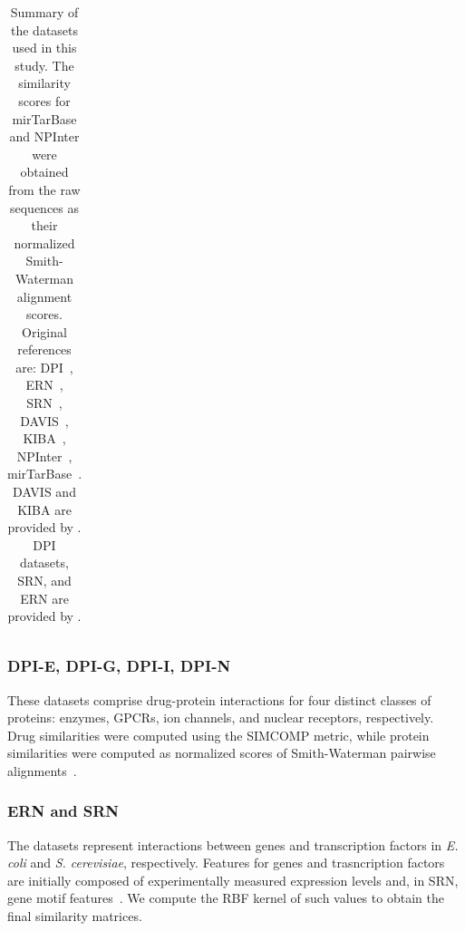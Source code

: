 \begin{table}[tb]
\begin{tabular}{lrrr}
        \bottomrule
    \end{tabular}
    \caption{Summary of the datasets used in this study. The similarity scores for mirTarBase and NPInter were obtained from the raw sequences as their normalized Smith-Waterman alignment scores. %
    Original references are:
        DPI~\cite{yamanishi2008},
        ERN~\cite{faith2007},
        SRN~\cite{macisaac2006}, %
        DAVIS~\cite{davis2011}, %
        KIBA~\cite{tang2014}, %
        NPInter~\cite{teng2020npinter}, 
        mirTarBase~\cite{huang2022mirtarbase}. 
        DAVIS and KIBA are provided by \citet{huang2020deeppurpose}. DPI datasets, SRN, and ERN are provided by \citet{schrynemackers2015}.
}
    \label{tab:datasets}
\end{table}


\subsubsection{DPI-E, DPI-G, DPI-I, DPI-N}

These datasets comprise drug-protein interactions for four distinct classes of proteins: enzymes, GPCRs, ion channels, and nuclear receptors, respectively. Drug similarities were computed using the SIMCOMP metric, while protein similarities were computed as normalized scores of Smith-Waterman pairwise alignments~\cite{yamanishi2008}.

\subsubsection{ERN and SRN}
The datasets represent interactions between genes and transcription factors in \textit{E. coli} and \textit{S. cerevisiae}, respectively. Features for genes and trasncription factors are initially composed of experimentally measured expression levels and, in SRN, gene motif features~\cite{brohee2011,schrynemackers2015}. We compute the RBF kernel of such values to obtain the final similarity matrices. %

